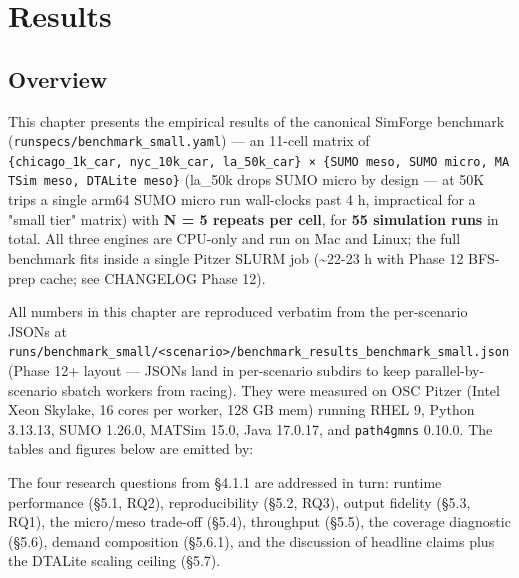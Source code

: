 \chapter{Results}\label{chapter-5-results}

\section{Overview}\label{50-overview}

This chapter presents the empirical results of the canonical SimForge
benchmark (\texttt{runspecs/benchmark\_small.yaml}) --- an 11-cell
matrix of
\texttt{\{chicago\_1k\_car,\ nyc\_10k\_car,\ la\_50k\_car\}\ ×\ \{SUMO\ meso,\ SUMO\ micro,\ MATSim\ meso,\ DTALite\ meso\}}
(la\_50k drops SUMO micro by design --- at 50K trips a single arm64 SUMO
micro run wall-clocks past 4 h, impractical for a "small tier" matrix)
with \textbf{N = 5 repeats per cell}, for \textbf{55 simulation runs} in
total. All three engines are CPU-only and run on Mac and Linux; the full
benchmark fits inside a single Pitzer SLURM job (\textasciitilde22-23 h
with Phase 12 BFS-prep cache; see CHANGELOG Phase 12).

All numbers in this chapter are reproduced verbatim from the
per-scenario JSONs at
\texttt{runs/benchmark\_small/\textless{}scenario\textgreater{}/benchmark\_results\_benchmark\_small.json}
(Phase 12+ layout --- JSONs land in per-scenario subdirs to keep
parallel-by-scenario sbatch workers from racing). They were measured on
OSC Pitzer (Intel Xeon Skylake, 16 cores per worker, 128 GB mem) running
RHEL 9, Python 3.13.13, SUMO 1.26.0, MATSim 15.0, Java 17.0.17, and
\texttt{path4gmns} 0.10.0. The tables and figures below are emitted by:

\begin{Shaded}
\begin{Highlighting}[]
 
  
 
\end{Highlighting}
\end{Shaded}

The four research questions from §4.1.1 are addressed in turn: runtime
performance (§5.1, RQ2), reproducibility (§5.2, RQ3), output fidelity
(§5.3, RQ1), the micro/meso trade-off (§5.4), throughput (§5.5), the
coverage diagnostic (§5.6), demand composition (§5.6.1), and the
discussion of headline claims plus the DTALite scaling ceiling (§5.7).


